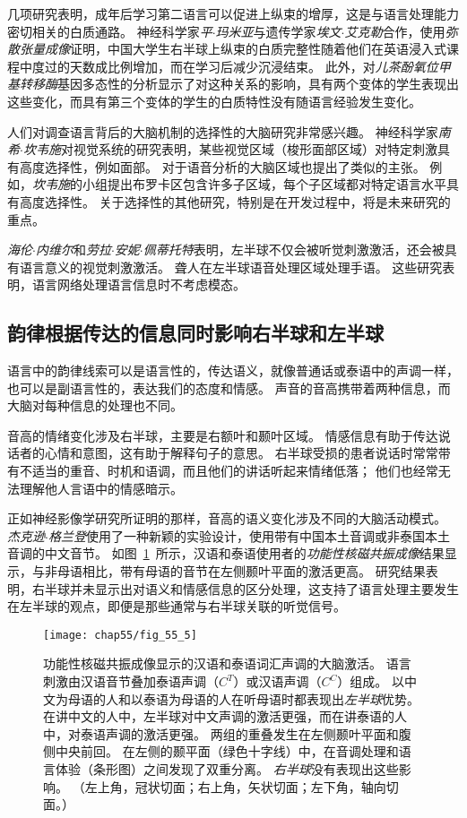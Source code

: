 几项研究表明，成年后学习第二语言可以促进上纵束的增厚，这是与语言处理能力密切相关的白质通路。
神经科学家\textit{平$\cdot$玛米亚}与遗传学家\textit{埃文$\cdot$艾克勒}合作，使用\textit{弥散张量成像}证明，中国大学生右半球上纵束的白质完整性随着他们在英语浸入式课程中度过的天数成比例增加，而在学习后减少沉浸结束。
此外，对\textit{儿茶酚氧位甲基转移酶}基因多态性的分析显示了对这种关系的影响，具有两个变体的学生表现出这些变化，而具有第三个变体的学生的白质特性没有随语言经验发生变化。


人们对调查语言背后的大脑机制的选择性的大脑研究非常感兴趣。
神经科学家\textit{南希$\cdot$坎韦施}对视觉系统的研究表明，某些视觉区域（梭形面部区域）对特定刺激具有高度选择性，例如面部。
对于语音分析的大脑区域也提出了类似的主张。
例如，\textit{坎韦施}的小组提出布罗卡区包含许多子区域，每个子区域都对特定语言水平具有高度选择性。
关于选择性的其他研究，特别是在开发过程中，将是未来研究的重点。


\textit{海伦$\cdot$内维尔}和\textit{劳拉$\cdot$安妮$\cdot$佩蒂托特}表明，左半球不仅会被听觉刺激激活，还会被具有语言意义的视觉刺激激活。
聋人在左半球语音处理区域处理手语。
这些研究表明，语言网络处理语言信息时不考虑模态。



\subsection{韵律根据传达的信息同时影响右半球和左半球}

语言中的韵律线索可以是语言性的，传达语义，就像普通话或泰语中的声调一样，也可以是副语言性的，表达我们的态度和情感。
声音的音高携带着两种信息，而大脑对每种信息的处理也不同。


音高的情绪变化涉及右半球，主要是右额叶和颞叶区域。
情感信息有助于传达说话者的心情和意图，这有助于解释句子的意思。
右半球受损的患者说话时常常带有不适当的重音、时机和语调，而且他们的讲话听起来情绪低落；
他们也经常无法理解他人言语中的情感暗示。


正如神经影像学研究所证明的那样，音高的语义变化涉及不同的大脑活动模式。
\textit{杰克逊$\cdot$格兰登}使用了一种新颖的实验设计，使用带有中国本土音调或非泰国本土音调的中文音节。
如图~\ref{fig:55_5}~所示，汉语和泰语使用者的\textit{功能性核磁共振成像}结果显示，与非母语相比，带有母语的音节在左侧颞叶平面的激活更高。
研究结果表明，右半球并未显示出对语义和情感信息的区分处理，这支持了语言处理主要发生在左半球的观点，即便是那些通常与右半球关联的听觉信号。


\begin{figure}[htbp]
	\centering
	\texttt{[image: chap55/fig\_55\_5]}
	\caption{功能性核磁共振成像显示的汉语和泰语词汇声调的大脑激活。
		语言刺激由汉语音节叠加泰语声调（$ C^T $）或汉语声调（$ C^C $）组成。
		以中文为母语的人和以泰语为母语的人在听母语时都表现出\textit{左半球}优势。
		在讲中文的人中，左半球对中文声调的激活更强，而在讲泰语的人中，对泰语声调的激活更强。
		两组的重叠发生在左侧颞叶平面和腹侧中央前回。
		在左侧的颞平面（绿色十字线）中，在音调处理和语言体验（条形图）之间发现了双重分离。
		\textit{右半球}没有表现出这些影响\cite{xu2006activation}。
		（左上角，冠状切面；右上角，矢状切面；左下角，轴向切面。）}
	\label{fig:55_5}
\end{figure}


